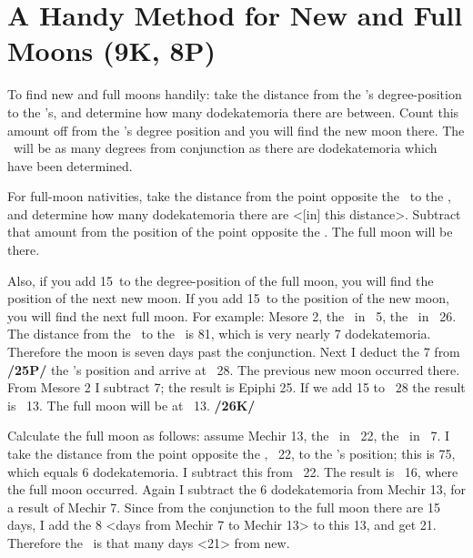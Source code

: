 \section{A Handy Method for New and Full Moons (9K, 8P)}
To find new and full moons handily: take the distance from the \Sun’s degree-position to the \Moon’s, and determine how many dodekatemoria there are between. Count this amount off from the \Sun’s degree position and you will find the new moon there. The \Moon\, will be as many degrees from conjunction as there are dodekatemoria which have been determined. 

For full-moon nativities, take the distance from the point opposite the \Sun\, to the \Moon, and determine how many dodekatemoria there are <[in] this distance>. Subtract that amount from the position of the point opposite the \Sun. The full moon will be there. 

Also, if you add 15\deg\, to the degree-position of the full moon, you will find the position of the next new moon. If you add 15\deg\, to the position of the new moon, you will find the next full moon. For example: Mesore 2, the \Sun\, in \Leo\, 5\deg, the \Moon\, in \Libra\, 26\deg. The distance from the \Sun\, to the \Moon\, is 81\deg, which is very nearly 7 dodekatemoria. Therefore the moon is seven days past the conjunction. Next I deduct the 7 from \textbf{/25P/} the \Sun’s position and arrive at \Cancer\, 28\deg. The previous new moon occurred there. From Mesore 2 I subtract 7; the result is Epiphi 25. If we add 15 to \Cancer\, 28\deg
the result is \Leo\, 13\deg. The full moon will be at \Aquarius\, 13\deg. \textbf{/26K/} 

Calculate the full moon as follows: assume Mechir 13, the \Sun\, in \Aquarius\, 22\deg, the \Moon\, in \Scorpio\, 7\deg. I take the distance from the point opposite the \Sun, \Leo\, 22\deg, to the \Moon’s position; this is
75\deg, which equals 6 dodekatemoria. I subtract this from \Leo\, 22\deg. The result is \Leo\, 16\deg, where the full moon occurred. Again I subtract the 6 dodekatemoria from Mechir 13, for a result of Mechir 7. Since from the conjunction to the full moon there are 15 days, I add the 8 <days from Mechir 7 to Mechir 13> to this 13, and get 21. Therefore the \Moon\, is that many days <21> from new.

\newpage